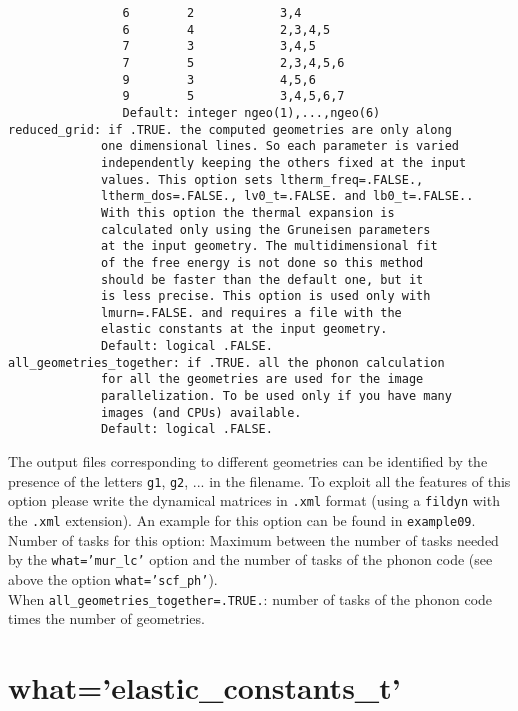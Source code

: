\documentclass[12pt,a4paper,twoside]{report}
\begin{document}
\begin{verbatim}
                6        2            3,4
                6        4            2,3,4,5
                7        3            3,4,5
                7        5            2,3,4,5,6
                9        3            4,5,6
                9        5            3,4,5,6,7
                Default: integer ngeo(1),...,ngeo(6)
reduced_grid: if .TRUE. the computed geometries are only along 
             one dimensional lines. So each parameter is varied 
             independently keeping the others fixed at the input 
             values. This option sets ltherm_freq=.FALSE., 
             ltherm_dos=.FALSE., lv0_t=.FALSE. and lb0_t=.FALSE..
             With this option the thermal expansion is 
             calculated only using the Gruneisen parameters 
             at the input geometry. The multidimensional fit 
             of the free energy is not done so this method 
             should be faster than the default one, but it
             is less precise. This option is used only with 
             lmurn=.FALSE. and requires a file with the 
             elastic constants at the input geometry.
             Default: logical .FALSE.
all_geometries_together: if .TRUE. all the phonon calculation 
             for all the geometries are used for the image 
             parallelization. To be used only if you have many 
             images (and CPUs) available.
             Default: logical .FALSE.
\end{verbatim}

The output files corresponding to different geometries can be identified
by the presence of the letters \texttt{g1}, \texttt{g2}, ... in the filename.
To exploit all the features of this option please write the dynamical matrices
in \texttt{.xml} format (using a \texttt{fildyn} with the \texttt{.xml}
extension).
An example for this option can be found in \texttt{example09}. \\
Number of tasks for this option: Maximum between the number of tasks  
needed by the \texttt{what='mur\_lc'} option and the number
of tasks of the phonon code (see above the option \texttt{what='scf\_ph'}). \\
When \texttt{all\_geometries\_together=.TRUE.}: number of tasks of the
phonon code times the number of geometries. \\

\newpage
{\color{coral}\section{what='elastic\_constants\_t'}}
\color{black}
\end{document}
